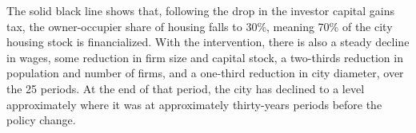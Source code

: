 The solid black line shows that, following the drop in the investor capital gains tax,  the owner-occupier share of housing falls to 30\%, meaning 70\% of the city housing stock is financialized. 
With the intervention, there is also a steady decline in wages, some reduction in firm size and capital stock, a two-thirds reduction in population and number of firms, and a one-third reduction in city diameter, over the 25 periods. At the end of that period, the city has declined to a level approximately where it was at approximately thirty-years periods before the policy change. %


